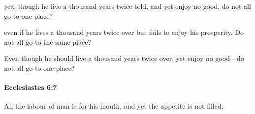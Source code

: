 			\begin{versebox}
					\item[BHS] 
					\item[LXX] 
					\item[ASV] yea, though he live a thousand years twice told, and yet enjoy no good, do not all go to one place?
					\item[NIV] even if he lives a thousand years twice over but fails to enjoy his prosperity. Do not all go to the same place?
					\item[NRSV] Even though he should live a thousand years twice over, yet enjoy no good—do not all go to one place?
			\end{versebox}

		\paragraph{Ecclesiastes 6:7} %
			\label{ECCLESIASTES-6-7}

			All the labour of man is for his mouth, and yet the appetite is not filled.

